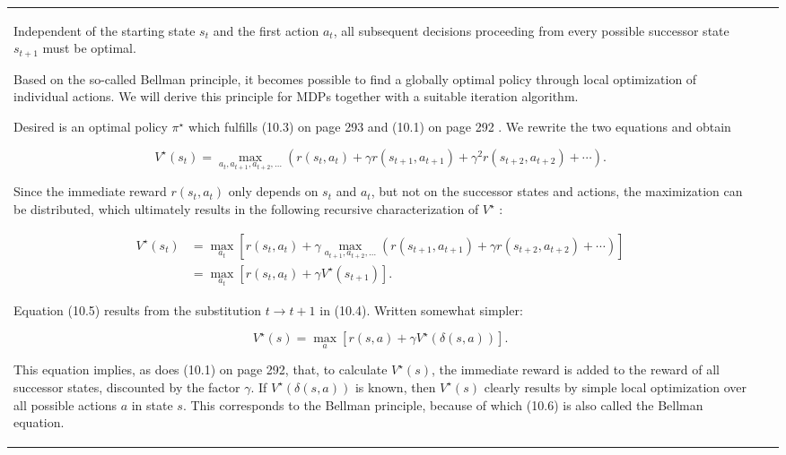 \documentclass[10pt]{book}
\begin{document}
\begin{center}
\begin{tabular}{|l|l|l|}
Independent of the starting state $s_{t}$ and the first action $a_{t}$, all subsequent decisions proceeding from every possible successor state $s_{t+1}$ must be optimal.

Based on the so-called Bellman principle, it becomes possible to find a globally optimal policy through local optimization of individual actions. We will derive this principle for MDPs together with a suitable iteration algorithm.

Desired is an optimal policy $\pi^{\star}$ which fulfills (10.3) on page 293 and (10.1) on page 292 . We rewrite the two equations and obtain

\begin{equation*}
V^{\star}\left(s_{t}\right)=\max _{a_{t}, a_{t+1}, a_{t+2}, \ldots}\left(r\left(s_{t}, a_{t}\right)+\gamma r\left(s_{t+1}, a_{t+1}\right)+\gamma^{2} r\left(s_{t+2}, a_{t+2}\right)+\cdots\right) . \tag{10.4}
\end{equation*}

Since the immediate reward $r\left(s_{t}, a_{t}\right)$ only depends on $s_{t}$ and $a_{t}$, but not on the successor states and actions, the maximization can be distributed, which ultimately results in the following recursive characterization of $V^{\star}$ :

\begin{align*}
V^{\star}\left(s_{t}\right) & =\max _{a_{t}}\left[r\left(s_{t}, a_{t}\right)+\gamma \max _{a_{t+1}, a_{t+2}, \ldots}\left(r\left(s_{t+1}, a_{t+1}\right)+\gamma r\left(s_{t+2}, a_{t+2}\right)+\cdots\right)\right] \\
& =\max _{a_{t}}\left[r\left(s_{t}, a_{t}\right)+\gamma V^{\star}\left(s_{t+1}\right)\right] . \tag{10.5}
\end{align*}

Equation (10.5) results from the substitution $t \rightarrow t+1$ in (10.4). Written somewhat simpler:

\begin{equation*}
V^{\star}(s)=\max _{a}\left[r(s, a)+\gamma V^{\star}(\delta(s, a))\right] . \tag{10.6}
\end{equation*}

This equation implies, as does (10.1) on page 292, that, to calculate $V^{\star}(s)$, the immediate reward is added to the reward of all successor states, discounted by the factor $\gamma$. If $V^{\star}(\delta(s, a))$ is known, then $V^{\star}(s)$ clearly results by simple local optimization over all possible actions $a$ in state $s$. This corresponds to the Bellman principle, because of which (10.6) is also called the Bellman equation.


\end{tabular}
\end{center}
\end{document}
